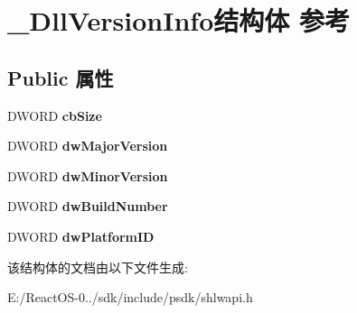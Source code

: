 \hypertarget{struct___dll_version_info}{}\section{\+\_\+\+Dll\+Version\+Info结构体 参考}
\label{struct___dll_version_info}
\subsection*{Public 属性}
\begin{DoxyCompactItemize}
\item 
\mbox{\label{struct___dll_version_info_a556460909a18a0d75899f13df7dc5c99}} 
D\+W\+O\+RD {\bfseries cb\+Size}
\item 
\mbox{\label{struct___dll_version_info_a08208ad6c659dc52da902aec44f22e12}} 
D\+W\+O\+RD {\bfseries dw\+Major\+Version}
\item 
\mbox{\label{struct___dll_version_info_a4b9b0d6ff090d189b6380418d80ab919}} 
D\+W\+O\+RD {\bfseries dw\+Minor\+Version}
\item 
\mbox{\label{struct___dll_version_info_a28c8aaad5c4e5482c859e0d152b67052}} 
D\+W\+O\+RD {\bfseries dw\+Build\+Number}
\item 
\mbox{\label{struct___dll_version_info_aac45eda4c64481a933d2c871f8f12a59}} 
D\+W\+O\+RD {\bfseries dw\+Platform\+ID}
\end{DoxyCompactItemize}


该结构体的文档由以下文件生成\+:\begin{DoxyCompactItemize}
\item 
E\+:/\+React\+O\+S-\/0../sdk/include/psdk/shlwapi.\+h\end{DoxyCompactItemize}

